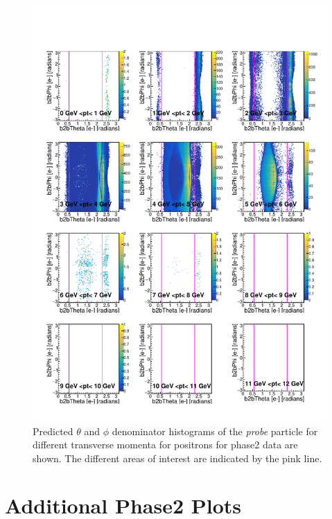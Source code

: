 \documentclass[a4paper,11pt,twosided,final,german,openbib,pdftex,listof=totoc,bibliography=totoc]{scrbook}
\begin{document}
\begin{appendix}
\begin{figure}[h!]
	\includegraphics[width=\textwidth]{Plots/master/RTPtMepE_Data.pdf}
	\caption[Enumerator $\theta$-$\phi$ Positron Transverse Momentum Phase2 Data]{Predicted $\theta$ and $\phi$ denominator histograms of the \textit{probe} particle for different transverse momenta for positrons for phase2 data are shown. The different areas of interest are indicated by the pink line.}
	\label{plt:RTtPMepE_Data}
\end{figure}





\chapter{Additional Phase2 Plots}
\label{A:2}














\end{appendix}
\end{document}

